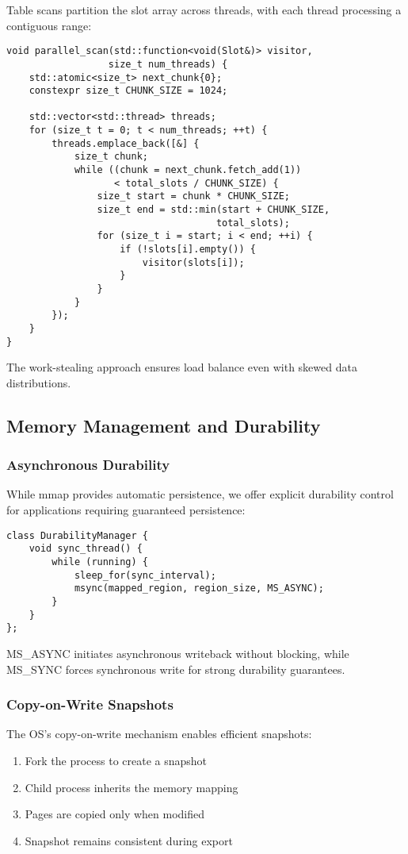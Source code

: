 \documentclass[10pt,conference]{IEEEtran}
\begin{document}
Table scans partition the slot array across threads, with each thread processing a contiguous range:

\begin{lstlisting}[caption={Parallel scan with work stealing},label={lst:parallel-scan}]
void parallel_scan(std::function<void(Slot&)> visitor,
                  size_t num_threads) {
    std::atomic<size_t> next_chunk{0};
    constexpr size_t CHUNK_SIZE = 1024;
    
    std::vector<std::thread> threads;
    for (size_t t = 0; t < num_threads; ++t) {
        threads.emplace_back([&] {
            size_t chunk;
            while ((chunk = next_chunk.fetch_add(1)) 
                   < total_slots / CHUNK_SIZE) {
                size_t start = chunk * CHUNK_SIZE;
                size_t end = std::min(start + CHUNK_SIZE,
                                     total_slots);
                for (size_t i = start; i < end; ++i) {
                    if (!slots[i].empty()) {
                        visitor(slots[i]);
                    }
                }
            }
        });
    }
}
\end{lstlisting}

The work-stealing approach ensures load balance even with skewed data distributions.

\subsection{Memory Management and Durability}

\subsubsection{Asynchronous Durability}
While mmap provides automatic persistence, we offer explicit durability control for applications requiring guaranteed persistence:

\begin{lstlisting}[caption={Durability manager implementation},label={lst:durability}]
class DurabilityManager {
    void sync_thread() {
        while (running) {
            sleep_for(sync_interval);
            msync(mapped_region, region_size, MS_ASYNC);
        }
    }
};
\end{lstlisting}

MS\_ASYNC initiates asynchronous writeback without blocking, while MS\_SYNC forces synchronous write for strong durability guarantees.

\subsubsection{Copy-on-Write Snapshots}
The OS's copy-on-write mechanism enables efficient snapshots:
\begin{enumerate}
\item Fork the process to create a snapshot
\item Child process inherits the memory mapping
\item Pages are copied only when modified
\item Snapshot remains consistent during export
\end{enumerate}
\end{document}
